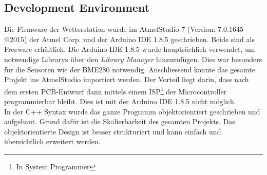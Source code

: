 \subsection{Development Environment}
\label{subsec:dev_envir}
Die Firmware der Wetterstation wurde im AtmelStudio 7 (Version: 7.0.1645 @2015) der Atmel Corp. und der Arduino IDE 1.8.5 geschrieben. Beide sind als Freeware erhältlich. Die Arduino IDE 1.8.5 wurde hauptsächlich verwendet, um notwendige Librarys über den \textit{Library Manager} hinzuzufügen. Dies war besonders für die Sensoren wie der BME280 notwendig. Anschliessend konnte das gesamte Projekt ins AtmelStudio importiert werden. Der Vorteil liegt darin, dass nach dem ersten PCB-Entwurf dann mittels einem ISP\footnote{In System Programmer} der Microcontroller programmierbar bleibt. Dies ist mit der Arduino IDE 1.8.5 nicht möglich.\\


In der C++ Syntax wurde das ganze Programm objektorientiert geschrieben und aufgebaut. Grund dafür ist die Skalierbarkeit des gesamten Projekts. Das objektorientierte Design ist besser strukturiert und kann einfach und übersichtlich erweitert werden.\\